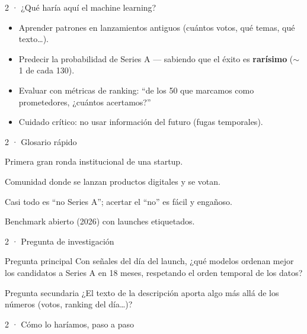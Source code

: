\begin{frame}{2 · ¿Qué haría aquí el machine learning?}
  \begin{itemize}
    \item Aprender patrones en lanzamientos antiguos (cuántos votos, qué temas, qué texto\ldots).
    \item Predecir la probabilidad de Series A --- sabiendo que el éxito es \textbf{rarísimo} ($\sim$1 de cada 130).
    \item Evaluar con métricas de ranking: ``de los 50 que marcamos como prometedores, ¿cuántos acertamos?''
    \item Cuidado crítico: no usar información del futuro (fugas temporales).
  \end{itemize}
\end{frame}

\begin{frame}{2 · Glosario rápido}
  \begin{description}[font=\bfseries\scriptsize,style=nextline,leftmargin=1.4cm]
    \item[Series A] Primera gran ronda institucional de una startup.
    \item[Product Hunt] Comunidad donde se lanzan productos digitales y se votan.
    \item[Desbalance] Casi todo es ``no Series A''; acertar el ``no'' es fácil y engañoso.
    \item[PHBench] Benchmark abierto (2026) con launches etiquetados.
  \end{description}
\end{frame}

\begin{frame}{2 · Pregunta de investigación}
  \begin{block}{Pregunta principal}
    Con señales del día del launch, ¿qué modelos ordenan mejor los candidatos a Series A en 18 meses, respetando el orden temporal de los datos?
  \end{block}
  \begin{block}{Pregunta secundaria}
    ¿El texto de la descripción aporta algo más allá de los números (votos, ranking del día\ldots)?
  \end{block}
\end{frame}

\begin{frame}{2 · Cómo lo haríamos, paso a paso}
\end{frame}

